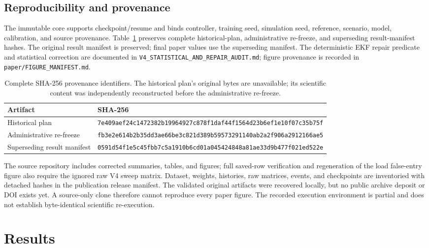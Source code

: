 \documentclass[conference]{IEEEtran}
\begin{document}
\subsection{Reproducibility and provenance}
\label{sec:provenance}

The immutable core supports checkpoint/resume and binds controller, training
seed, simulation seed, reference, scenario, model, calibration, and source
provenance. Table~\ref{tab:provenance} preserves complete historical-plan,
administrative re-freeze, and superseding result-manifest hashes.
The original result manifest is preserved; final paper values use the
superseding manifest.
The deterministic EKF repair predicate and statistical correction are
documented in \texttt{V4\_STATISTICAL\_AND\_REPAIR\_AUDIT.md}; figure
provenance is recorded in \texttt{paper/FIGURE\_MANIFEST.md}.

\begin{table}[!t]
\centering
\footnotesize
\caption{Complete SHA-256 provenance identifiers. The historical plan's
original bytes are unavailable; its scientific content was independently
reconstructed before the administrative re-freeze.}
\label{tab:provenance}
\begin{tabular}{@{}ll@{}}
\toprule
Artifact & SHA-256 \\
\midrule
Historical plan & \texttt{7e409aef24c1472382b19964927c878f1daf44f1564d23b6ef1e10f07c35b75f} \\
Administrative re-freeze & \texttt{fb3e2e614b2b35dd3ae66be3c821d389b59573291140ab2a2f906a2912166ae5} \\
Superseding result manifest & \texttt{0591d54f1e5c45fbb7c5a1910b6cd01a045424848a81ae33d9b477f021ed522e} \\
\bottomrule
\end{tabular}
\end{table}

The source repository includes corrected summaries, tables, and figures;
full saved-row verification and regeneration of the load false-entry figure
also require the ignored raw V4 sweep matrix. Dataset, weights, histories,
raw matrices, events, and checkpoints are inventoried with detached hashes
in the publication release manifest. The validated original artifacts were
recovered locally, but no public archive deposit or DOI exists yet.
A source-only clone therefore cannot reproduce every paper figure.
The recorded execution environment is partial and does not establish
byte-identical scientific re-execution.

\section{Results}
\label{sec:results}
\end{document}
